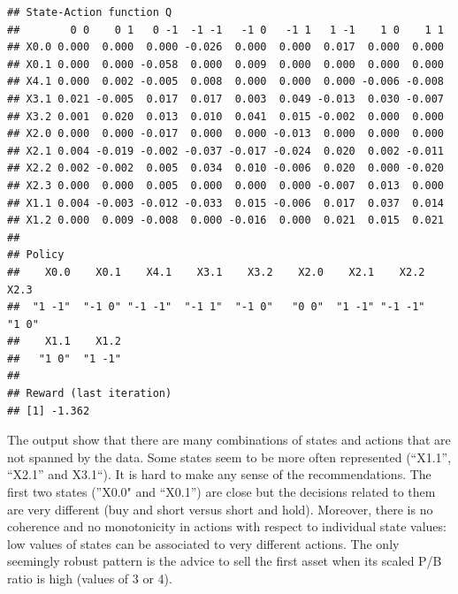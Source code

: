 \documentclass[]{krantz}
\makeatletter
\newenvironment{Shaded}{\begin{snugshade}}{\end{snugshade}}
\newcommand{\CommentTok}[1]{\textcolor[rgb]{0.37,0.37,0.37}{\textit{#1}}}
\newcommand{\DataTypeTok}[1]{\textcolor[rgb]{0.27,0.27,0.27}{#1}}
\newcommand{\DecValTok}[1]{\textcolor[rgb]{0.06,0.06,0.06}{#1}}
\newcommand{\KeywordTok}[1]{\textcolor[rgb]{0.27,0.27,0.27}{\textbf{#1}}}
\newcommand{\NormalTok}[1]{#1}
\newcommand{\OperatorTok}[1]{\textcolor[rgb]{0.43,0.43,0.43}{\textbf{#1}}}
\newcommand{\StringTok}[1]{\textcolor[rgb]{0.5,0.5,0.5}{#1}}
\newenvironment{kframe}{%
\medskip{}
\setlength{\fboxsep}{.8em}
 \def\at@end@of@kframe{}%
 \ifinner\ifhmode%
  \def\at@end@of@kframe{\end{minipage}}%
  \begin{minipage}{\columnwidth}%
 \fi\fi%
 \def\FrameCommand##1{\hskip\@totalleftmargin \hskip-\fboxsep
 \colorbox{shadecolor}{##1}\hskip-\fboxsep
     \hskip-\linewidth \hskip-\@totalleftmargin \hskip\columnwidth}%
 \MakeFramed {\advance\hsize-\width
   \@totalleftmargin\z@ \linewidth\hsize
   \@setminipage}}%
 {\par\unskip\endMakeFramed%
 \at@end@of@kframe}
\renewenvironment{Shaded}{\begin{kframe}}{\end{kframe}}
\theoremstyle{definition}
\theoremstyle{definition}
\theoremstyle{definition}
\theoremstyle{remark}
\makeatother
\begin{document}
\footnotesize

\begin{Shaded}
\end{Shaded}

\begin{verbatim}
## State-Action function Q
##        0 0    0 1   0 -1  -1 -1   -1 0   -1 1   1 -1    1 0    1 1
## X0.0 0.000  0.000  0.000 -0.026  0.000  0.000  0.017  0.000  0.000
## X0.1 0.000  0.000 -0.058  0.000  0.009  0.000  0.000  0.000  0.000
## X4.1 0.000  0.002 -0.005  0.008  0.000  0.000  0.000 -0.006 -0.008
## X3.1 0.021 -0.005  0.017  0.017  0.003  0.049 -0.013  0.030 -0.007
## X3.2 0.001  0.020  0.013  0.010  0.041  0.015 -0.002  0.000  0.000
## X2.0 0.000  0.000 -0.017  0.000  0.000 -0.013  0.000  0.000  0.000
## X2.1 0.004 -0.019 -0.002 -0.037 -0.017 -0.024  0.020  0.002 -0.011
## X2.2 0.002 -0.002  0.005  0.034  0.010 -0.006  0.020  0.000 -0.020
## X2.3 0.000  0.000  0.005  0.000  0.000  0.000 -0.007  0.013  0.000
## X1.1 0.004 -0.003 -0.012 -0.033  0.015 -0.006  0.017  0.037  0.014
## X1.2 0.000  0.009 -0.008  0.000 -0.016  0.000  0.021  0.015  0.021
## 
## Policy
##    X0.0    X0.1    X4.1    X3.1    X3.2    X2.0    X2.1    X2.2    X2.3 
##  "1 -1"  "-1 0" "-1 -1"  "-1 1"  "-1 0"   "0 0"  "1 -1" "-1 -1"   "1 0" 
##    X1.1    X1.2 
##   "1 0"  "1 -1" 
## 
## Reward (last iteration)
## [1] -1.362
\end{verbatim}

\normalsize

The output show that there are many combinations of states and actions
that are not spanned by the data. Some states seem to be more often
represented (``X1.1'', ``X2.1'' and X3.1``). It is hard to make any
sense of the recommendations. The first two states (''X0.0" and
``X0.1'') are close but the decisions related to them are very different
(buy and short versus short and hold). Moreover, there is no coherence
and no monotonicity in actions with respect to individual state values:
low values of states can be associated to very different actions. The
only seemingly robust pattern is the advice to sell the first asset when
its scaled P/B ratio is high (values of 3 or 4).
\end{document}
